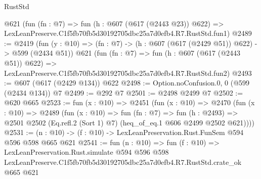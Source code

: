 \begin{lexlean}{RustStd}
\begin{coremodule}
    @621
    (fun (fn : @7) =>
    fun (h : @607 (@617 (@2443 @23)) @622) =>
    LexLeanPreserve.C1f5fb70fb5d30192705dbc25a7d0efb4.R7.RustStd.fun1)
@2489 := @2419
    (fun (y : @10) => (fn : @7) -> (h : @607 (@617 (@2429 @51)) @622) -> @599 (@2434 @51))
    @621
    (fun (fn : @7) =>
    fun (h : @607 (@617 (@2443 @51)) @622) =>
    LexLeanPreserve.C1f5fb70fb5d30192705dbc25a7d0efb4.R7.RustStd.fun2)
@2493 := @607 (@617 (@2429 @134)) @622
@2498 := Option.noConfusion.{0, 0} (@599 (@2434 @134)) @7
@2499 := @292 @7
@2501 := @2498 @2499 @7
@2502 := @620 @665
@2523 := fun (x : @10) =>
  @2451
    (fun (x : @10) =>
    @2470
      (fun (x : @10) =>
      @2489
        (fun (x : @10) =>
        fun (fn : @7) =>
        fun (h : @2493) =>
        @2501 @2502 (Eq.refl.{2} (Sort 1) @7) (heq_of_eq.{1} @606 @2499 @2502 @621))))
@2531 := (n : @10) -> (f : @10) -> LexLeanPreservation.Rust.FunSem @594 @596 @598 @665 @621
@2541 := fun (n : @10) =>
  fun (f : @10) =>
  LexLeanPreservation.Rust.simulate
    @594
    @596
    @598
    LexLeanPreserve.C1f5fb70fb5d30192705dbc25a7d0efb4.R7.RustStd.crate_ok
    @665
    @621
\end{coremodule}
\end{lexlean}
